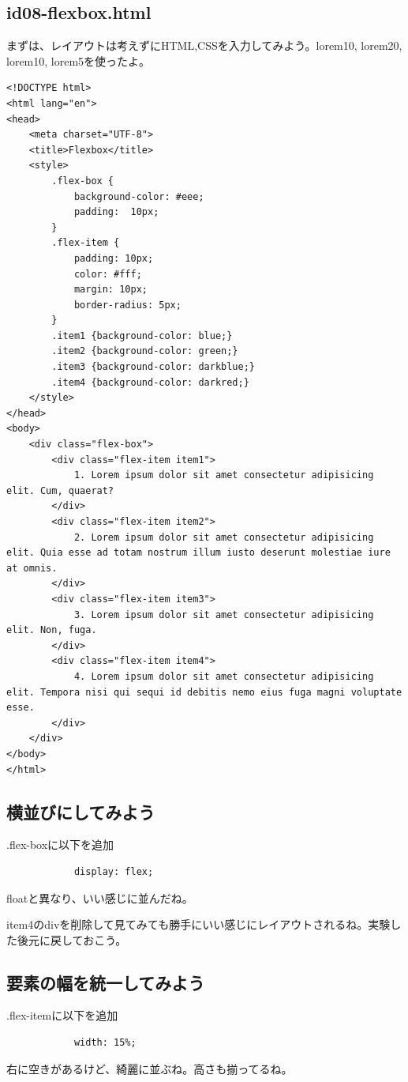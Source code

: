 \documentclass[mingoth,11pt,a4j,uplatex,dvipdfmx]{jsarticle}
\begin{document}
\subsection{id08-flexbox.html}
まずは、レイアウトは考えずにHTML,CSSを入力してみよう。lorem10, lorem20, lorem10, lorem5を使ったよ。
\begin{lstlisting}
<!DOCTYPE html>
<html lang="en">
<head>
    <meta charset="UTF-8">
    <title>Flexbox</title>
    <style>
        .flex-box {
            background-color: #eee;
            padding:  10px;
        }
        .flex-item {
            padding: 10px;
            color: #fff;
            margin: 10px;
            border-radius: 5px;
        }
        .item1 {background-color: blue;}
        .item2 {background-color: green;}
        .item3 {background-color: darkblue;}
        .item4 {background-color: darkred;}
    </style>
</head>
<body>
    <div class="flex-box">
        <div class="flex-item item1">
            1. Lorem ipsum dolor sit amet consectetur adipisicing elit. Cum, quaerat?
        </div>
        <div class="flex-item item2">
            2. Lorem ipsum dolor sit amet consectetur adipisicing elit. Quia esse ad totam nostrum illum iusto deserunt molestiae iure at omnis.
        </div>
        <div class="flex-item item3">
            3. Lorem ipsum dolor sit amet consectetur adipisicing elit. Non, fuga.
        </div>
        <div class="flex-item item4">
            4. Lorem ipsum dolor sit amet consectetur adipisicing elit. Tempora nisi qui sequi id debitis nemo eius fuga magni voluptate esse.
        </div>
    </div>
</body>
</html>
\end{lstlisting}

\subsection{横並びにしてみよう}
.flex-boxに以下を追加
\begin{lstlisting}
            display: flex;
\end{lstlisting}
floatと異なり、いい感じに並んだね。

item4のdivを削除して見てみても勝手にいい感じにレイアウトされるね。実験した後元に戻しておこう。

\subsection{要素の幅を統一してみよう}
.flex-itemに以下を追加
\begin{lstlisting}
            width: 15%;
\end{lstlisting}
右に空きがあるけど、綺麗に並ぶね。高さも揃ってるね。
\end{document}
